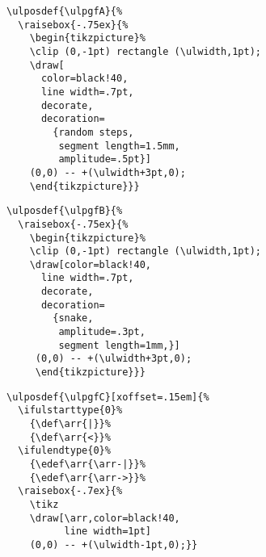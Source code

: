 \documentclass[a4paper,twocolumn]{article}
\begin{document}
\begin{verbatim}
\ulposdef{\ulpgfA}{%
  \raisebox{-.75ex}{%
    \begin{tikzpicture}%
    \clip (0,-1pt) rectangle (\ulwidth,1pt);
    \draw[
      color=black!40,
      line width=.7pt,
      decorate,
      decoration=
        {random steps,
         segment length=1.5mm,
         amplitude=.5pt}]
    (0,0) -- +(\ulwidth+3pt,0);
    \end{tikzpicture}}}
\end{verbatim}

\ulposdef\ulpgfA{%
  \raisebox{-.75ex}{%
    \begin{tikzpicture}%
    \clip (0,-1pt) rectangle (\ulwidth,1pt);
    \draw[
      color=black!40,
      line width=.7pt,
      decorate,
      decoration=
        {random steps,segment length=1.5mm,amplitude=.5pt}]
    (0,0) -- +(\ulwidth+3pt,0);
    \end{tikzpicture}}}

\ulpossample\ulpgfA

\begin{verbatim}
\ulposdef{\ulpgfB}{%
  \raisebox{-.75ex}{%
    \begin{tikzpicture}%
    \clip (0,-1pt) rectangle (\ulwidth,1pt);
    \draw[color=black!40,
      line width=.7pt,
      decorate,
      decoration=
        {snake,
         amplitude=.3pt,
         segment length=1mm,}]
     (0,0) -- +(\ulwidth+3pt,0);
     \end{tikzpicture}}}
\end{verbatim}

\ulposdef\ulpgfB{%
 \raisebox{-.75ex}{%
  \begin{tikzpicture}%
  \clip (0,-1pt) rectangle (\ulwidth,1pt);
  \draw[color=black!40,
   line width=.7pt,
   decorate,
   decoration=
     {snake, amplitude=.3pt,segment length=1mm,}]
   (0,0) -- +(\ulwidth+3pt,0);
   \end{tikzpicture}}}

\ulpossample\ulpgfB

\begin{verbatim}
\ulposdef{\ulpgfC}[xoffset=.15em]{%
  \ifulstarttype{0}%
    {\def\arr{|}}%
    {\def\arr{<}}%
  \ifulendtype{0}%
    {\edef\arr{\arr-|}}%
    {\edef\arr{\arr->}}%
  \raisebox{-.7ex}{%
    \tikz
    \draw[\arr,color=black!40,
          line width=1pt]
    (0,0) -- +(\ulwidth-1pt,0);}}
\end{verbatim}

\ulposdef{}
\end{document}
